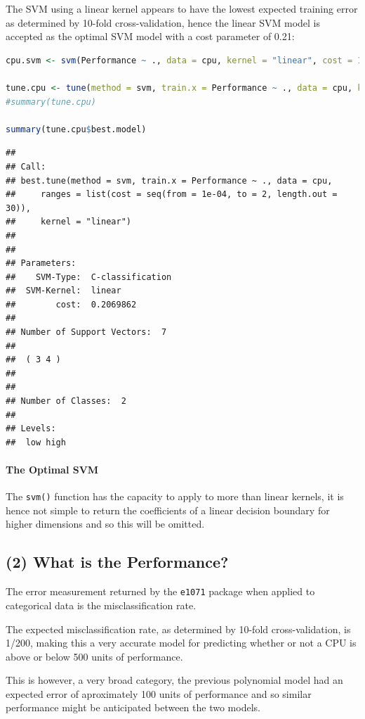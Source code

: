 \documentclass[
]{article}
\newcommand{\passthrough}[1]{#1}
\begin{document}
\newpage

The SVM using a linear kernel appears to have the lowest expected training error as
determined by 10-fold cross-validation, hence the linear SVM model is
accepted as the optimal SVM model with a cost parameter of 0.21:

\begin{lstlisting}[language=R]
cpu.svm <- svm(Performance ~ ., data = cpu, kernel = "linear", cost = 10, scale = FALSE)

tune.cpu <- tune(method = svm, train.x = Performance ~ ., data = cpu, kernel = "linear", ranges = list(cost = seq(from = 0.0001, to = 2, length.out = 30)))
#summary(tune.cpu)

summary(tune.cpu$best.model)
\end{lstlisting}

\begin{lstlisting}[basicstyle=\footnotesize \ttfamily]
## 
## Call:
## best.tune(method = svm, train.x = Performance ~ ., data = cpu, 
##     ranges = list(cost = seq(from = 1e-04, to = 2, length.out = 30)), 
##     kernel = "linear")
## 
## 
## Parameters:
##    SVM-Type:  C-classification 
##  SVM-Kernel:  linear 
##        cost:  0.2069862 
## 
## Number of Support Vectors:  7
## 
##  ( 3 4 )
## 
## 
## Number of Classes:  2 
## 
## Levels: 
##  low high
\end{lstlisting}


\hypertarget{The-Optimal-SVM}{%
	\paragraph{The Optimal SVM}\label{create-the-svm}}



The \passthrough{\lstinline!svm()!} function has the capacity to apply to more than
linear kernels, it is hence not simple to return the coefficients of a linear
decision boundary for higher dimensions and so this will be omitted. 


\hypertarget{what-is-the-peformance}{%
\subsection{(2) What is the Performance?}\label{what-is-the-peformance}}

The error measurement returned by the \passthrough{\lstinline!e1071!} package when
applied to categorical data is the misclassification rate.

The expected misclassification rate, as determined by 10-fold cross-validation, is 1/200, making this a very accurate model for predicting
whether or not a CPU is above or below 500 units of performance.

This is however, a very
broad category, the previous polynomial model  had an expected error
of aproximately 100 units of performance and so similar performance might be anticipated between the two models.
\end{document}
